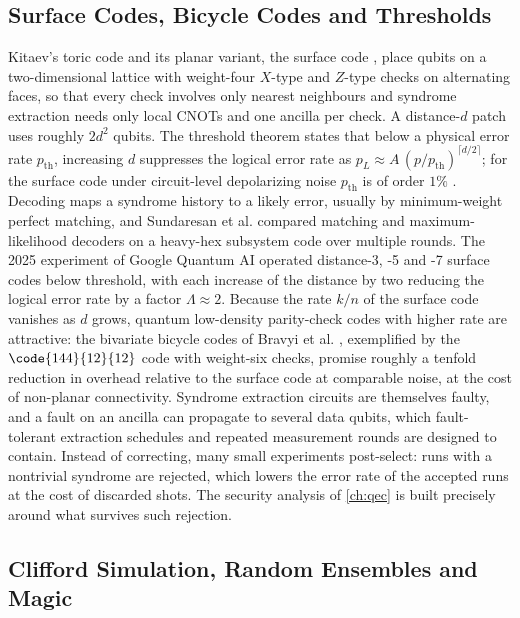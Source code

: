 \subsection{Surface Codes, Bicycle Codes and Thresholds}

Kitaev's toric code \cite{kitaev2003anyons} and its planar variant, the surface code \cite{dennis2002topological,fowler2012surfacecodes}, place qubits on a two-dimensional lattice with weight-four $X$-type and $Z$-type checks on alternating faces, so that every check involves only nearest neighbours and syndrome extraction needs only local CNOTs and one ancilla per check. A distance-$d$ patch uses roughly $2d^2$ qubits. The threshold theorem states that below a physical error rate $p_{\mathrm{th}}$, increasing $d$ suppresses the logical error rate as $p_L\approx A\,(p/p_{\mathrm{th}})^{\lceil d/2\rceil}$; for the surface code under circuit-level depolarizing noise $p_{\mathrm{th}}$ is of order $1\%$ \cite{fowler2012surfacecodes}. Decoding maps a syndrome history to a likely error, usually by minimum-weight perfect matching, and Sundaresan et al. \cite{sundaresan2023subsystem} compared matching and maximum-likelihood decoders on a heavy-hex subsystem code over multiple rounds. The 2025 experiment of Google Quantum AI \cite{acharya2025belowthreshold} operated distance-3, -5 and -7 surface codes below threshold, with each increase of the distance by two reducing the logical error rate by a factor $\Lambda\approx2$. Because the rate $k/n$ of the surface code vanishes as $d$ grows, quantum low-density parity-check codes with higher rate are attractive: the bivariate bicycle codes of Bravyi et al. \cite{bravyi2024bicycle}, exemplified by the $\code{144}{12}{12}$ code with weight-six checks, promise roughly a tenfold reduction in overhead relative to the surface code at comparable noise, at the cost of non-planar connectivity. Syndrome extraction circuits are themselves faulty, and a fault on an ancilla can propagate to several data qubits, which fault-tolerant extraction schedules and repeated measurement rounds are designed to contain. Instead of correcting, many small experiments post-select: runs with a nontrivial syndrome are rejected, which lowers the error rate of the accepted runs at the cost of discarded shots. The security analysis of \cref{ch:qec} \cite{guo2026qecaudit} is built precisely around what survives such rejection.

\subsection{Clifford Simulation, Random Ensembles and Magic}

